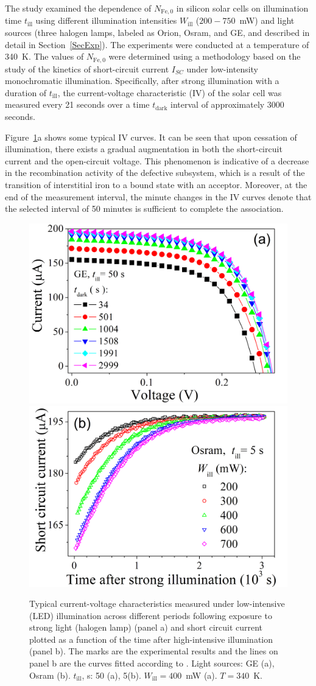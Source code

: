 \documentclass{WileyMSP-template}
\begin{document}
The study examined the dependence of $N_\mathrm{Fe,0}$ in silicon solar cells on illumination time $t_\mathrm{ill}$
using different illumination intensities $W_\mathrm{ill}$ ($200-750$~mW) and light sources
(three halogen lamps, labeled as Orion, Osram, and GE, and described in detail in Section~\ref{SecExp}).
The experiments were conducted at a temperature of 340~K.
The values of $N_\mathrm{Fe,0}$ were  determined using a methodology \cite{Olikh2022:JMatSci,Olikh2021JAP}
based on the study of the kinetics of short-circuit current $I_{SC}$ under low-intensity monochromatic illumination.
Specifically, after strong illumination with a duration of $t_\mathrm{ill}$,
the current-voltage characteristic (IV) of the solar cell was measured every 21 seconds over a time $t_\mathrm{dark}$ interval of approximately 3000 seconds.

Figure~\ref{fig2}a shows some typical IV curves.
It can be seen that upon cessation of illumination, there exists a gradual augmentation in both the short-circuit current and the open-circuit voltage.
This phenomenon is indicative of a decrease in the recombination activity of the defective subsystem,
which is a result of the transition of interstitial iron to a bound state with an acceptor.
Moreover, at the end of the measurement interval, the minute changes in the IV curves denote that the selected interval of 50 minutes is sufficient to complete the association.


\begin{figure}
\centering
  \includegraphics[width=0.4\linewidth]{Fig2a.png}
  \includegraphics[width=0.4\linewidth]{Fig2b.png}
  \caption{Typical current-voltage characteristics measured
  under low-intensive (LED) illumination across different periods following exposure to strong light (halogen lamp) (panel a) and
  short circuit current plotted as a function of the time after high-intensive illumination (panel b).
  The marks are the experimental results and the lines on panel b are the curves fitted according to \cite{Olikh2022:JMatSci,Olikh2021JAP}.
  Light sources: GE (a), Osram (b).
  $t_\mathrm{ill}$, s: 50 (a), 5(b).
  $W_\mathrm{ill}=400$~mW (a).
  $T=340$~K.}
  \label{fig2}
\end{figure}
\end{document}
